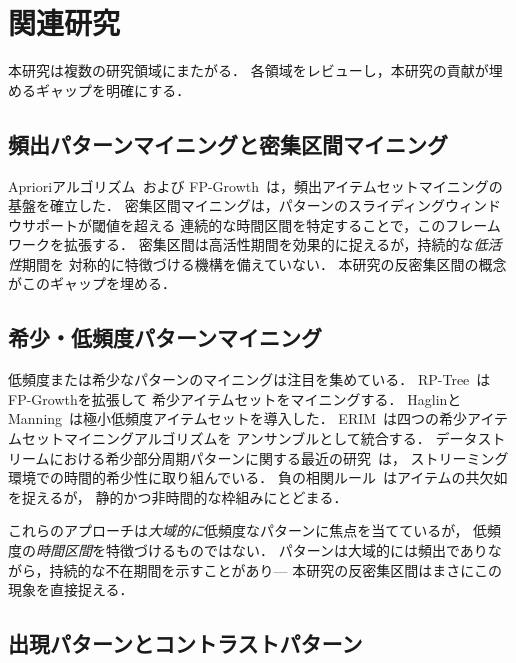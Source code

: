 \section{関連研究}\label{sec:related}

本研究は複数の研究領域にまたがる．
各領域をレビューし，本研究の貢献が埋めるギャップを明確にする．

\subsection{頻出パターンマイニングと密集区間マイニング}

Aprioriアルゴリズム~\cite{agrawal1994apriori}および
FP-Growth~\cite{han2000fpgrowth}は，頻出アイテムセットマイニングの基盤を確立した．
密集区間マイニングは，パターンのスライディングウィンドウサポートが閾値を超える
連続的な時間区間を特定することで，このフレームワークを拡張する．
密集区間は高活性期間を効果的に捉えるが，持続的な\emph{低活性}期間を
対称的に特徴づける機構を備えていない．
本研究の反密集区間の概念がこのギャップを埋める．

\subsection{希少・低頻度パターンマイニング}

低頻度または希少なパターンのマイニングは注目を集めている．
RP-Tree~\cite{szathmary2011rptree}はFP-Growthを拡張して
希少アイテムセットをマイニングする．
HaglinとManning~\cite{haglin2007minimal}は極小低頻度アイテムセットを導入した．
ERIM~\cite{akdas2024erim}は四つの希少アイテムセットマイニングアルゴリズムを
アンサンブルとして統合する．
データストリームにおける希少部分周期パターンに関する最近の研究~\cite{kiran2025r3pstream}は，
ストリーミング環境での時間的希少性に取り組んでいる．
負の相関ルール~\cite{wu2024negative}はアイテムの共欠如を捉えるが，
静的かつ非時間的な枠組みにとどまる．

これらのアプローチは\emph{大域的に}低頻度なパターンに焦点を当てているが，
低頻度の\emph{時間区間}を特徴づけるものではない．
パターンは大域的には頻出でありながら，持続的な不在期間を示すことがあり---
本研究の反密集区間はまさにこの現象を直接捉える．

\subsection{出現パターンとコントラストパターン}

